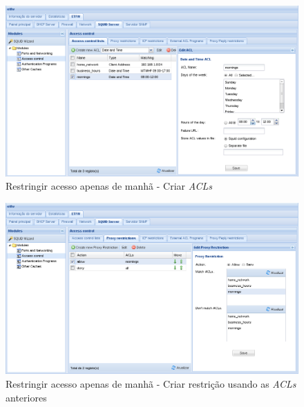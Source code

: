 \begin{figure}[H]
    \begin{center}
    \includegraphics[scale=0.38]{screenshots/etfw/etfw_squid_example_time_02_01.png}
    \caption{Restringir acesso apenas de manhã - Criar \textit{ACLs}}
    \label{fig:etfw_squid_example_time_02_01}
    \end{center}
\end{figure}

\begin{figure}[H]
    \begin{center}
    \includegraphics[scale=0.38]{screenshots/etfw/etfw_squid_example_time_02_02.png}
    \caption{Restringir acesso apenas de manhã - Criar restrição usando as \textit{ACLs} anteriores}
    \label{fig:etfw_squid_example_time_02_02}
    \end{center}
\end{figure}

